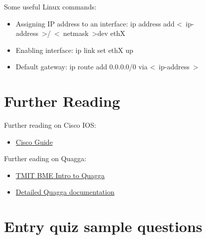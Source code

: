 \documentclass[a4paper]{article}
\begin{document}
Some useful Linux commands:

\begin{itemize}
    \item Assigning IP address to an interface: ip address add
          \textless~ip-address~\textgreater/~\textless~netmask~\textgreater dev ethX
    \item Enabling interface: ip link set ethX up
    \item Default gateway: ip route add 0.0.0.0/0 via \textless~ip-address~\textgreater
\end{itemize}

\section{Further Reading}\label{sec:further-reading}
Further reading on Cisco IOS:
\begin{itemize}
    \item \href{https://qosip.tmit.bme.hu/foswiki/pub/Meres/SwitchLinkekAggregalasaFeladatok/cisco_guide_en.doc}{Cisco
              Guide}
\end{itemize}

Further eading on Quagga:
\begin{itemize}
    \item \href{http://unixlinux.tmit.bme.hu/Quagga}{TMIT BME Intro to Quagga}
    \item \href{http://downloads.pf.itd.nrl.navy.mil/docs/ospf-manet/quagga.pdf}{Detailed Quagga documentation}
\end{itemize}

\appendix

\section{Entry quiz sample questions}
\end{document}
